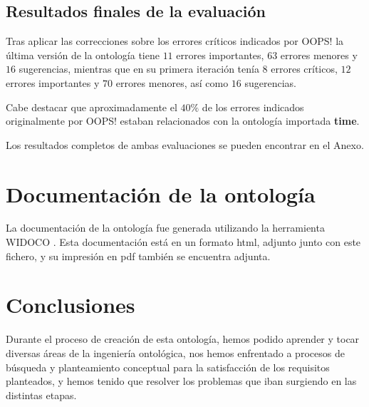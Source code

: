 \documentclass[a4paper,12pt]{article}
\begin{document}
	\subsection{Resultados finales de la evaluación}
	
	Tras aplicar las correcciones sobre los errores críticos indicados por OOPS! la última versión de la ontología tiene $11$ errores importantes, $63$ errores menores y $16$ sugerencias, mientras que en su primera iteración tenía $8$ errores críticos, $12$ errores importantes y $70$ errores menores, así como $16$ sugerencias.
	
	Cabe destacar que aproximadamente el $40\%$ de los errores indicados originalmente por OOPS! estaban relacionados con la ontología importada \textbf{time}.
	
	Los resultados completos de ambas evaluaciones se pueden encontrar en el Anexo.
	
	\section{Documentación de la ontología}
	La documentación de la ontología fue generada utilizando la herramienta WIDOCO \cite{widoco}. Esta documentación está en un formato html, adjunto junto con este fichero, y su impresión en pdf también se encuentra adjunta.
	
	\section{Conclusiones}
	Durante el proceso de creación de esta ontología, hemos podido aprender y tocar diversas
áreas de la ingeniería ontológica, nos hemos enfrentado a procesos de búsqueda y
planteamiento conceptual para la satisfacción de los requisitos planteados, y hemos tenido que
resolver los problemas que iban surgiendo en las distintas etapas.
	
\end{document}
